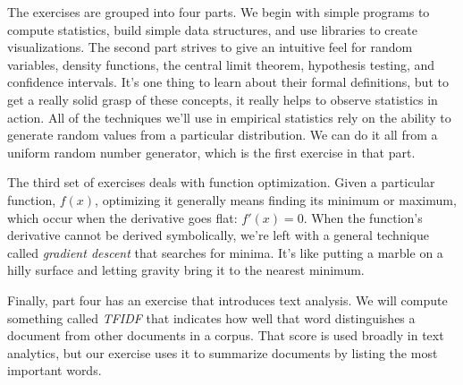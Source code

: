 \documentclass[titlepage]{tufte-book}
\begin{document}
{
}

The exercises are grouped into four parts. We begin with simple programs to compute statistics, build simple data structures, and use libraries to create visualizations. The second part strives to give an intuitive feel for random variables, density functions, the central limit theorem, hypothesis testing, and confidence intervals. It's one thing to learn about their formal definitions, but to get a really solid grasp of these concepts, it really helps to observe statistics in action. All of the techniques we'll use in empirical statistics rely on the ability to generate random values from a particular distribution. We can do it all from a uniform random number generator, which is the first exercise in that part.

The third set of exercises deals with function optimization. Given a particular function, $f(x)$, optimizing it generally means finding its minimum or maximum, which occur when the derivative goes flat: $f'(x) = 0$. When the function's derivative cannot be derived symbolically, we're left with a general technique called {\em gradient descent} that searches for minima. It's like putting a marble on a hilly surface and letting gravity bring it to the nearest minimum.


Finally, part four has an exercise that introduces text analysis. We will compute something called {\em TFIDF} that indicates how well that word distinguishes a document from other documents in a corpus.  That score is used broadly in text analytics, but our exercise uses it to summarize documents by listing the most important words.
\end{document}
